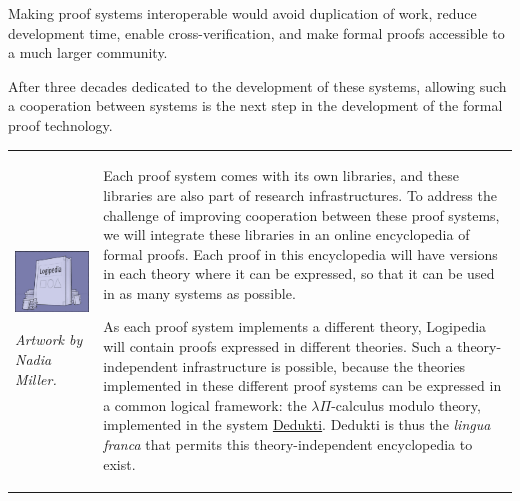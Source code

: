 Making proof systems interoperable would avoid duplication of work,
reduce development time, enable cross-verification, and make formal
proofs accessible to a much larger community.  

After three decades
dedicated to the development of these systems, allowing such a
cooperation between systems is the next step in the development of the
formal proof technology.

\medskip

\hspace{-0.8cm}
\begin{tabular}{p{}p{}}
\begin{minipage}{7cm}

\includegraphics[width=7cm]{img/Illustration3-reduced.jpg}

{\em \small Artwork by Nadia Miller.}

\end{minipage}
&
\begin{minipage}{9.85cm}
\hspace{0.4cm} Each proof system comes with its own libraries, and
these libraries are also part of research infrastructures. To address
the challenge of improving cooperation between these proof systems, we
will integrate these libraries in an online encyclopedia of formal
proofs. Each proof in this encyclopedia will have versions in each
theory where it can be expressed, so that it can be used in as many
systems as possible.  

\hspace{0.4cm} As each proof system implements a different theory,
Logipedia will contain proofs expressed in different theories.  Such a
theory-independent infrastructure is possible, because the
theories implemented in these different proof systems can be expressed
in a common logical framework: the $\lambda \Pi$-calculus modulo
theory, implemented in the system
\href{https://deducteam.github.io/}{Dedukti}. Dedukti is thus the {\em
  lingua franca} that permits this theory-independent encyclopedia to
exist.
\end{minipage}
\\
\end{tabular}

